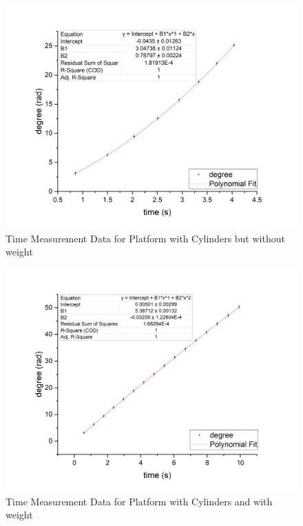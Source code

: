 \documentclass[12pt,a4paper]{article}
\begin{document}
\begin{figure}[h]
    \centering
    \includegraphics[width=12cm]{cylinderw.png}
    \caption{Time Measurement Data for Platform with Cylinders but without weight}
\end{figure}

\begin{figure}[h]
    \centering
    \includegraphics[width=12cm]{cylinderwo.png}
    \caption{Time Measurement Data for Platform with Cylinders and with weight}
\end{figure}
\end{document}
